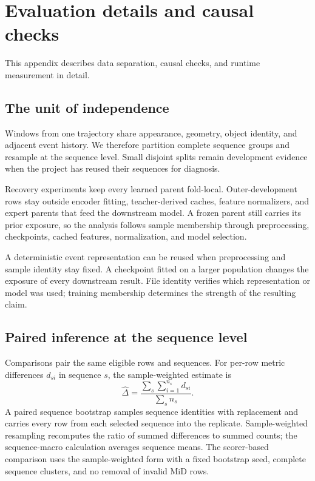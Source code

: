 \section{Evaluation details and causal checks}
\label{app:evaluation-details}
This appendix describes data separation, causal checks, and runtime measurement in detail.

\subsection{The unit of independence}
Windows from one trajectory share appearance, geometry, object identity, and adjacent event history. We therefore partition complete sequence groups and resample at the sequence level. Small disjoint splits remain development evidence when the project has reused their sequences for diagnosis. 

Recovery experiments keep every learned parent fold-local. Outer-development rows stay outside encoder fitting, teacher-derived caches, feature normalizers, and expert parents that feed the downstream model. A frozen parent still carries its prior exposure, so the analysis follows sample membership through preprocessing, checkpoints, cached features, normalization, and model selection.

A deterministic event representation can be reused when preprocessing and sample identity stay fixed. A checkpoint fitted on a larger population changes the exposure of every downstream result. File identity verifies which representation or model was used; training membership determines the strength of the resulting claim. 

\subsection{Paired inference at the sequence level}
Comparisons pair the same eligible rows and sequences. For per-row metric differences $d_{si}$ in sequence $s$, the sample-weighted estimate is
\begin{equation}
 \widehat\Delta=\frac{\sum_s\sum_{i=1}^{n_s}d_{si}}{\sum_s n_s}.
\end{equation}
A paired sequence bootstrap samples sequence identities with replacement and carries every row from each selected sequence into the replicate. Sample-weighted resampling recomputes the ratio of summed differences to summed counts; the sequence-macro calculation averages sequence means. The scorer-based comparison uses the sample-weighted form with a fixed bootstrap seed, complete sequence clusters, and no removal of invalid MiD rows. 

